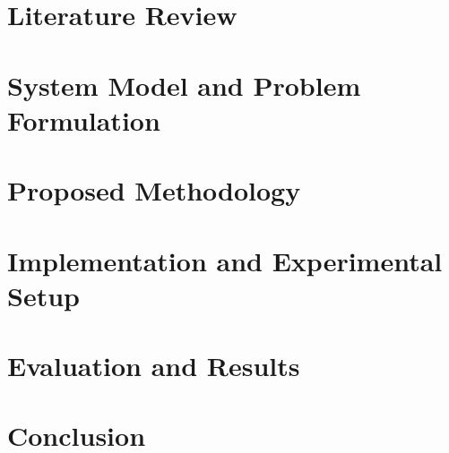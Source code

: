 \documentclass[12pt,phd,times]{pkmthesis}
\begin{document}
\chapter{Literature Review}\label{chap:L_surve}


\chapter{System Model and Problem Formulation}\label{chap:system_model}


\chapter{Proposed Methodology}\label{chap:methodology}


\chapter{Implementation and Experimental Setup}\label{chap:implementation}


\chapter{Evaluation and Results}\label{chap:results}


\chapter{Conclusion}\label{chap:conclusion}

\end{document}
